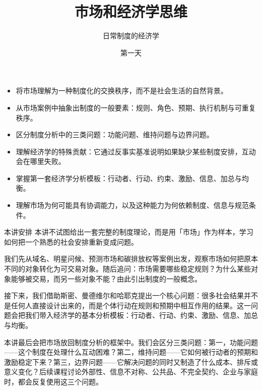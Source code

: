 \documentclass[UTF8,10pt,a4paper,scheme=chinese,fontset=none]{ctexart}
\title{\vspace{-2em}\bfseries 市场和经济学思维}
\author{日常制度的经济学}
\date{第一天}
\begin{document}
\maketitle
\thispagestyle{fancy}

\begin{goalsbox}
\begin{itemize}
  \item 将市场理解为一种制度化的交换秩序，而不是社会生活的自然背景。
  \item 从市场案例中抽象出制度的一般要素：规则、角色、预期、执行机制与可重复秩序。
  \item 区分制度分析中的三类问题：功能问题、维持问题与边界问题。
  \item 理解经济学的特殊贡献：它通过反事实基准说明如果缺少某些制度安排，互动会在哪里失败。
  \item 掌握第一套经济学分析模板：行动者、行动、约束、激励、信息、加总与均衡。
  \item 理解市场为何可能具有协调能力，以及这种能力为何依赖制度、信息与规范条件。
\end{itemize}
\end{goalsbox}

\begin{keybox}{本讲安排}
本讲不试图给出一套完整的制度理论，而是用「市场」作为样本，学习如何把一个熟悉的社会安排重新变成问题。

我们先从域名、明星问候、预测市场和碳排放权等案例出发，观察市场如何把原本不同的对象转化为可交易对象。随后追问：市场需要哪些稳定规则？为什么某些对象能够被交易，而另一些对象不能？由此引出制度的一般概念。

接下来，我们借助斯密、曼德维尔和哈耶克提出一个核心问题：很多社会结果并不是任何人直接设计出来的，而是个体行动在规则和预期中相互作用的结果。这一问题会把我们带入经济学的基本分析模板：行动者、行动、约束、激励、信息、加总与均衡。

本讲最后会把市场放回制度分析的框架中。我们会区分三类问题：第一，功能问题——这个制度在处理什么互动困难？第二，维持问题——它如何被行动者的预期和激励稳定下来？第三，边界问题——它解决问题的同时又制造了什么成本、排斥或意义变化？后续课程讨论外部性、信息不对称、公共品、不完全契约、企业与家庭时，都会反复使用这三个问题。
\end{keybox}


\end{document}
